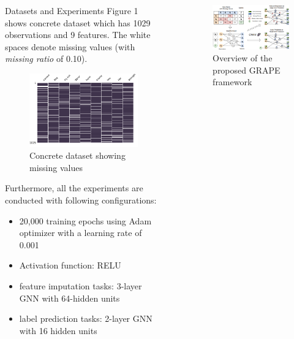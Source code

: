 \documentclass[final]{beamer}
\newlength{\sepwidth}
\newlength{\colwidth}
\newlength{\twocolwidth}
\newcommand{\separatorcolumn}{\begin{column}{\sepwidth}\end{column}}
\begin{document}
\begin{frame}[t]
\begin{columns}[t]
\begin{column}{\colwidth}
\begin{block}{Datasets and Experiments}
Figure 1 shows concrete dataset which has 1029 observations and 9 features. The white spaces denote missing values (with \textit{missing ratio} of 0.10).
 \begin{figure}
 	\includegraphics[width=1.04\textwidth]{figures/missing_plot.png}
 	\caption{Concrete dataset showing missing values}
 	\label{cdft}
 \end{figure}
  \end{block}

Furthermore, all the experiments are conducted with following configurations:
\begin{itemize}
    \item 20,000 training epochs using Adam optimizer with a learning rate of 0.001 \item Activation function: RELU
    \item feature imputation tasks: 3-layer GNN with 64-hidden units
    \item label prediction tasks: 2-layer GNN with 16 hidden units
\end{itemize}
\end{column}

\separatorcolumn
\begin{column}{\twocolwidth}
\begin{figure}
	\includegraphics[width=1\textwidth,height=0.5\textwidth]{figures/GRAPE_Framework.png}
	\caption{Overview of the proposed GRAPE framework}
	\label{fig:approach}
\end{figure}



\end{column}
\end{columns}
\end{frame}
\end{document}
